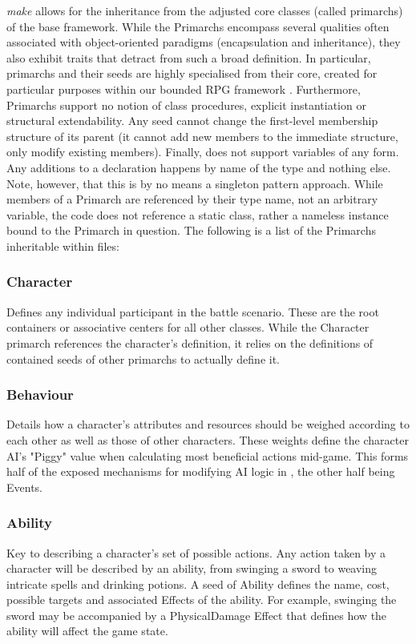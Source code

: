 \emph{make} allows for the inheritance from the adjusted core classes (called primarchs) of the base framework. While the Primarchs encompass several qualities often associated with object-oriented paradigms (encapsulation and inheritance), they also exhibit traits that detract from such a broad definition. In particular, primarchs and their seeds  are highly specialised from their core, created for particular purposes within our bounded RPG framework . Furthermore, Primarchs support no notion of class procedures, explicit instantiation or structural extendability. Any seed cannot change the first-level membership structure of its parent (it cannot add new members to the immediate structure, only modify existing members). Finally, \langname{} does not support variables of any form. Any additions to a declaration happens by name of the type and nothing else. Note, however, that this is by no means a singleton pattern approach. While members of a Primarch are referenced by their type name, not an arbitrary variable, the code does not reference a static class, rather a nameless instance bound to the Primarch in question. The following is a list of the Primarchs inheritable within \langname{} files:

\subsubsection{Character}
Defines any individual participant in the battle scenario. These are the root containers or associative centers for all other classes. While the Character primarch references the character's definition, it relies on the definitions of contained seeds of other primarchs to actually define it.

\subsubsection{Behaviour}
Details how a character's attributes and resources should be weighed according to each other as well as those of other characters. These weights define the character AI's "Piggy" value when calculating most beneficial actions mid-game. This forms half of the exposed mechanisms for modifying AI logic in \langname{}, the other half being Events. 

\subsubsection{Ability} 
Key to describing a character's set of possible actions. Any action taken by a character will be described by an ability, from swinging a sword to weaving intricate spells and drinking potions. A seed of Ability defines the name, cost, possible targets and associated Effects of the ability. For example, swinging the sword may be accompanied by a PhysicalDamage Effect that defines how the ability will affect the game state.

